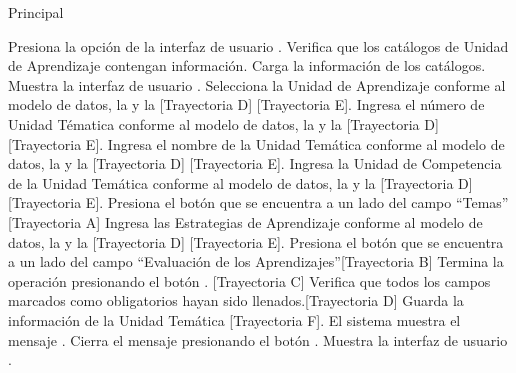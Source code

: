 \begin{UCtrayectoria}{Principal}

\UCpaso[\UCactor] Presiona la opción  de la interfaz de usuario .
\UCpaso Verifica que los catálogos de Unidad de Aprendizaje contengan información.
\UCpaso Carga la información de los catálogos.
\UCpaso Muestra la interfaz de usuario .
\UCpaso[\UCactor] Selecciona la Unidad de Aprendizaje conforme al modelo de datos, la  y la  [Trayectoria D] [Trayectoria E].
\UCpaso[\UCactor] Ingresa el número de Unidad Tématica conforme al modelo de datos, la  y la  [Trayectoria D] [Trayectoria E].
\UCpaso[\UCactor] Ingresa el nombre de la Unidad Temática conforme al modelo de datos, la  y la  [Trayectoria D] [Trayectoria E].
\UCpaso[\UCactor] Ingresa la Unidad de Competencia de la Unidad Temática conforme al modelo de datos, la  y la  [Trayectoria D] [Trayectoria E].
\UCpaso[\UCactor] Presiona el botón \BtnModal que se encuentra a un lado del campo ``Temas''  [Trayectoria A] 
\UCpaso[\UCactor] Ingresa las Estrategias de Aprendizaje conforme al modelo de datos, la  y la  [Trayectoria D] [Trayectoria E].
\UCpaso[\UCactor] Presiona el botón  \BtnModal que se encuentra a un lado del campo ``Evaluación de los Aprendizajes''[Trayectoria B] 
\UCpaso[\UCactor] Termina la operación presionando el botón . [Trayectoria C]
\UCpaso Verifica que todos los campos marcados como obligatorios hayan sido llenados.[Trayectoria D]
\UCpaso Guarda la información de la Unidad Temática [Trayectoria F].
\UCpaso El sistema muestra el mensaje .
\UCpaso[\UCactor] Cierra el mensaje presionando el botón . 
\UCpaso Muestra la interfaz de usuario .
\end{UCtrayectoria}


